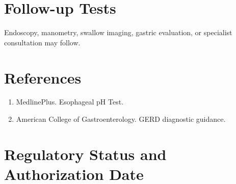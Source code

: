\section*{Follow-up Tests} Endoscopy, manometry, swallow imaging, gastric evaluation, or specialist consultation may follow.
\section*{References} \begin{enumerate}\item MedlinePlus. Esophageal pH Test.\item American College of Gastroenterology. GERD diagnostic guidance.\end{enumerate}
\clearpage\section*{Regulatory Status and Authorization Date}\clearpage
